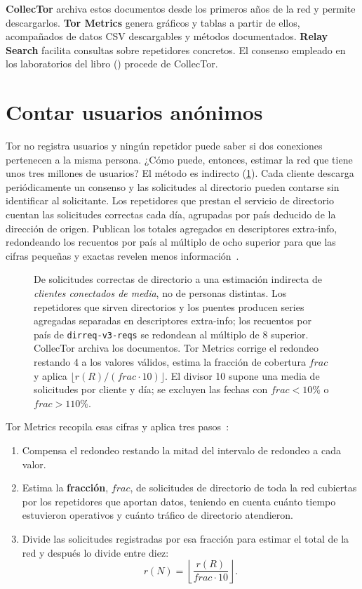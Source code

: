 \textbf{CollecTor} archiva estos documentos desde los primeros años de la red y permite descargarlos. \textbf{Tor Metrics} genera gráficos y tablas a partir de ellos, acompañados de datos CSV descargables y métodos documentados. \textbf{Relay Search} facilita consultas sobre repetidores concretos. El consenso empleado en los laboratorios del libro () procede de CollecTor.

\section{Contar usuarios anónimos}\label{sec:metrics-utenti}

Tor no registra usuarios y ningún repetidor puede saber si dos conexiones pertenecen a la misma persona. ¿Cómo puede, entonces, estimar la red que tiene unos tres millones de usuarios? El método es indirecto (\cref{fig:stima}). Cada cliente descarga periódicamente un consenso y las solicitudes al directorio pueden contarse sin identificar al solicitante. Los repetidores que prestan el servicio de directorio cuentan las solicitudes correctas cada día, agrupadas por país deducido de la dirección de origen. Publican los totales agregados en descriptores extra-info, redondeando los recuentos por país al múltiplo de ocho superior para que las cifras pequeñas y exactas revelen menos información~.

\begin{figure}[htbp]
\centering

\caption{De solicitudes correctas de directorio a una estimación indirecta de \emph{clientes conectados de media}, no de personas distintas. Los repetidores que sirven directorios y los puentes producen series agregadas separadas en descriptores extra-info; los recuentos por país de \texttt{dirreq-v3-reqs} se redondean al múltiplo de 8 superior. CollecTor archiva los documentos. Tor Metrics corrige el redondeo restando 4 a los valores válidos, estima la fracción de cobertura $\mathit{frac}$ y aplica $\lfloor r(R)/(\mathit{frac}\cdot10)\rfloor$. El divisor 10 supone una media de solicitudes por cliente y día; se excluyen las fechas con $\mathit{frac}<10\%$ o $\mathit{frac}>110\%$.}
\label{fig:stima}
\end{figure}

Tor Metrics recopila esas cifras y aplica tres pasos~\cite{metricsreproducible}:
\begin{enumerate}
  \item Compensa el redondeo restando la mitad del intervalo de redondeo a cada valor.
  \item Estima la \textbf{fracción}, $\mathit{frac}$, de solicitudes de directorio de toda la red cubiertas por los repetidores que aportan datos, teniendo en cuenta cuánto tiempo estuvieron operativos y cuánto tráfico de directorio atendieron.
  \item Divide las solicitudes registradas por esa fracción para estimar el total de la red y después lo divide entre diez:
\[ r(N) = \left\lfloor \frac{r(R)}{\mathit{frac} \cdot 10} \right\rfloor. \]
\end{enumerate}

